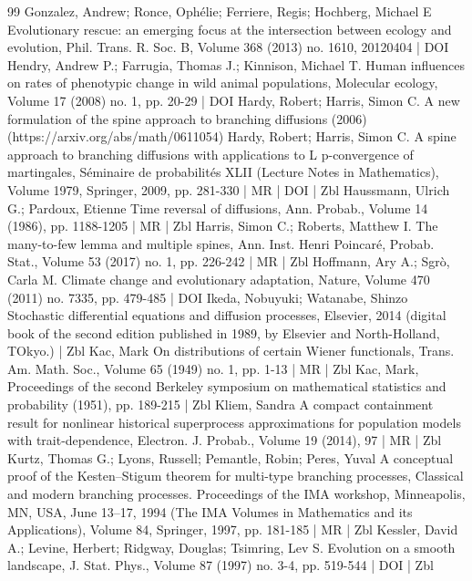 \documentclass[10pt]{amsart}
\theoremstyle{definition}\newtheorem{defi}[theo]{Definition}\newtheorem{rema}[theo]{Remark}\newtheorem{exam}[theo]{Example}\newtheorem{exem}[theo]{Example}\newtheorem{nota}[theo]{Notation}
\begin{document}
\begin{thebibliography}{99}
Gonzalez, Andrew; Ronce, Ophélie; Ferriere, Regis; Hochberg, Michael E Evolutionary rescue: an emerging focus at the intersection between ecology and evolution, Phil. Trans. R. Soc. B, Volume 368 (2013) no. 1610, 20120404 | DOI
Hendry, Andrew P.; Farrugia, Thomas J.; Kinnison, Michael T. Human influences on rates of phenotypic change in wild animal populations, Molecular ecology, Volume 17 (2008) no. 1, pp. 20-29 | DOI
Hardy, Robert; Harris, Simon C. A new formulation of the spine approach to branching diffusions (2006) (https://arxiv.org/abs/math/0611054)
Hardy, Robert; Harris, Simon C. A spine approach to branching diffusions with applications to L p-convergence of martingales, Séminaire de probabilités XLII (Lecture Notes in Mathematics), Volume 1979, Springer, 2009, pp. 281-330 | MR | DOI | Zbl
Haussmann, Ulrich G.; Pardoux, Etienne Time reversal of diffusions, Ann. Probab., Volume 14 (1986), pp. 1188-1205 | MR | Zbl
Harris, Simon C.; Roberts, Matthew I. The many-to-few lemma and multiple spines, Ann. Inst. Henri Poincaré, Probab. Stat., Volume 53 (2017) no. 1, pp. 226-242 | MR | Zbl
Hoffmann, Ary A.; Sgrò, Carla M. Climate change and evolutionary adaptation, Nature, Volume 470 (2011) no. 7335, pp. 479-485 | DOI
Ikeda, Nobuyuki; Watanabe, Shinzo Stochastic differential equations and diffusion processes, Elsevier, 2014 (digital book of the second edition published in 1989, by Elsevier and North-Holland, TOkyo.) | Zbl
Kac, Mark On distributions of certain Wiener functionals, Trans. Am. Math. Soc., Volume 65 (1949) no. 1, pp. 1-13 | MR | Zbl
Kac, Mark, Proceedings of the second Berkeley symposium on mathematical statistics and probability (1951), pp. 189-215 | Zbl
Kliem, Sandra A compact containment result for nonlinear historical superprocess approximations for population models with trait-dependence, Electron. J. Probab., Volume 19 (2014), 97 | MR | Zbl
Kurtz, Thomas G.; Lyons, Russell; Pemantle, Robin; Peres, Yuval A conceptual proof of the Kesten–Stigum theorem for multi-type branching processes, Classical and modern branching processes. Proceedings of the IMA workshop, Minneapolis, MN, USA, June 13–17, 1994 (The IMA Volumes in Mathematics and its Applications), Volume 84, Springer, 1997, pp. 181-185 | MR | Zbl
Kessler, David A.; Levine, Herbert; Ridgway, Douglas; Tsimring, Lev S. Evolution on a smooth landscape, J. Stat. Phys., Volume 87 (1997) no. 3-4, pp. 519-544 | DOI | Zbl

\end{thebibliography}
\end{document}
